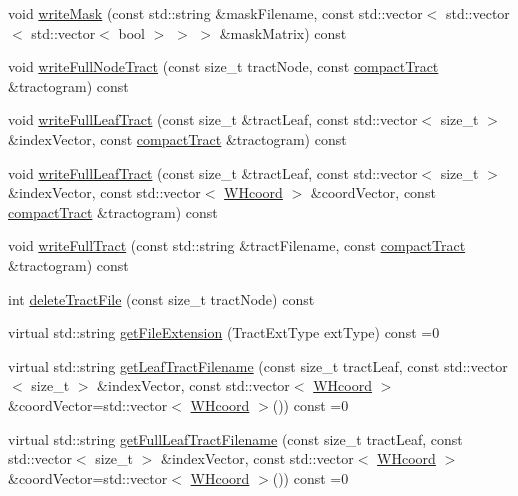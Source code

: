 \begin{DoxyCompactItemize}
\item 
void \hyperlink{classfileManager_ae0046132e19b4c681e02cb5634520c73}{write\-Mask} (const std\-::string \&mask\-Filename, const std\-::vector$<$ std\-::vector$<$ std\-::vector$<$ bool $>$ $>$ $>$ \&mask\-Matrix) const 
\item 
void \hyperlink{classfileManager_a0c021e5c0a8730c12bbb0180610b9b3f}{write\-Full\-Node\-Tract} (const size\-\_\-t tract\-Node, const \hyperlink{classcompactTract}{compact\-Tract} \&tractogram) const 
\item 
void \hyperlink{classfileManager_a52efe93c118c68d81750bd3823ddaf7a}{write\-Full\-Leaf\-Tract} (const size\-\_\-t \&tract\-Leaf, const std\-::vector$<$ size\-\_\-t $>$ \&index\-Vector, const \hyperlink{classcompactTract}{compact\-Tract} \&tractogram) const 
\item 
void \hyperlink{classfileManager_afc5104f7182377e8129cc6a0832f1720}{write\-Full\-Leaf\-Tract} (const size\-\_\-t \&tract\-Leaf, const std\-::vector$<$ size\-\_\-t $>$ \&index\-Vector, const std\-::vector$<$ \hyperlink{classWHcoord}{\-W\-Hcoord} $>$ \&coord\-Vector, const \hyperlink{classcompactTract}{compact\-Tract} \&tractogram) const 
\item 
void \hyperlink{classfileManager_a35cd539e7f007cac132ebebe16f7f1d0}{write\-Full\-Tract} (const std\-::string \&tract\-Filename, const \hyperlink{classcompactTract}{compact\-Tract} \&tractogram) const 
\item 
int \hyperlink{classfileManager_ab72645f0048c23b4bdba67d8942af1e9}{delete\-Tract\-File} (const size\-\_\-t tract\-Node) const 
\item 
virtual std\-::string \hyperlink{classfileManager_af1b2dea2761c3f0018b62077cb032aee}{get\-File\-Extension} (\-Tract\-Ext\-Type ext\-Type) const =0
\item 
virtual std\-::string \hyperlink{classfileManager_a24c2bf9055bfe28571866ce7586a3e34}{get\-Leaf\-Tract\-Filename} (const size\-\_\-t tract\-Leaf, const std\-::vector$<$ size\-\_\-t $>$ \&index\-Vector, const std\-::vector$<$ \hyperlink{classWHcoord}{\-W\-Hcoord} $>$ \&coord\-Vector=std\-::vector$<$ \hyperlink{classWHcoord}{\-W\-Hcoord} $>$()) const =0
\item 
virtual std\-::string \hyperlink{classfileManager_ac64c35e60f2a006b0a4d2af9e50d9029}{get\-Full\-Leaf\-Tract\-Filename} (const size\-\_\-t tract\-Leaf, const std\-::vector$<$ size\-\_\-t $>$ \&index\-Vector, const std\-::vector$<$ \hyperlink{classWHcoord}{\-W\-Hcoord} $>$ \&coord\-Vector=std\-::vector$<$ \hyperlink{classWHcoord}{\-W\-Hcoord} $>$()) const =0

\end{DoxyCompactItemize}

